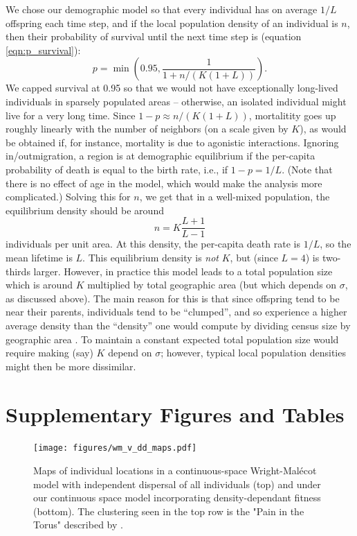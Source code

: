 \documentclass[10pt,twoside,lineno,hidelinks]{preprint}
\begin{document}
We chose our demographic model so that every individual has on average $1/L$ offspring
each time step,
and if the local population density of an individual is $n$,
then their probability of survival until the next time step is
(equation \eqref{eqn:p_survival}):
\begin{equation}
    p = \min\left( 0.95, \frac{1}{1 + n / (K (1+L))} \right) .
\end{equation}
We capped survival at 0.95 so that we would not have exceptionally long-lived individuals
in sparsely populated areas --
otherwise, an isolated individual might live for a very long time.
Since $1 - p \approx n / (K (1 + L))$,
mortalitity goes up roughly linearly with the number of neighbors (on a scale given by $K$),
as would be obtained if, for instance, mortality is due to agonistic interactions.
Ignoring in/outmigration,
a region is at demographic equilibrium if the per-capita probability of death
is equal to the birth rate,
i.e., if $1 - p = 1/L$.
(Note that there is no effect of age in the model,
which would make the analysis more complicated.)
Solving this for $n$,
we get that in a well-mixed population, the equilibrium density should be around
\begin{equation}
    n = K \frac{L+1}{L-1}
\end{equation}
individuals per unit area.
At this density, the per-capita death rate is $1/L$, so the mean lifetime is $L$.
This equilibrium density is \emph{not} $K$, but (since $L=4$) is two-thirds larger.
However, in practice this model leads to a total population size which is around $K$
multiplied by total geographic area
(but which depends on $\sigma$, as discussed above).
The main reason for this is that
since offspring tend to be near their parents, individuals tend to be ``clumped'',
and so experience a higher average density than the ``density'' one would compute
by dividing census size by geographic area \citep{lloyd1967crowding}.
To maintain a constant expected total population size
would require making (say) $K$ depend on $\sigma$;
however, typical local population densities might then be more dissimilar.


\stopappendix
\clearpage 

\beginsupplement
\section{Supplementary Figures and Tables}
\FloatBarrier

\begin{figure}[p]
\centering
\texttt{[image: figures/wm\_v\_dd\_maps.pdf]}
\caption{Maps of individual locations in a continuous-space Wright-Malécot model with independent dispersal of all individuals (top) and under our continuous space model incorporating density-dependant fitness (bottom). The clustering seen in the top row is the "Pain in the Torus" described by \citet{Felsenstein1975}.}
\label{fig:slim_has_no_pain} 
\end{figure}
\FloatBarrier
\end{document}

